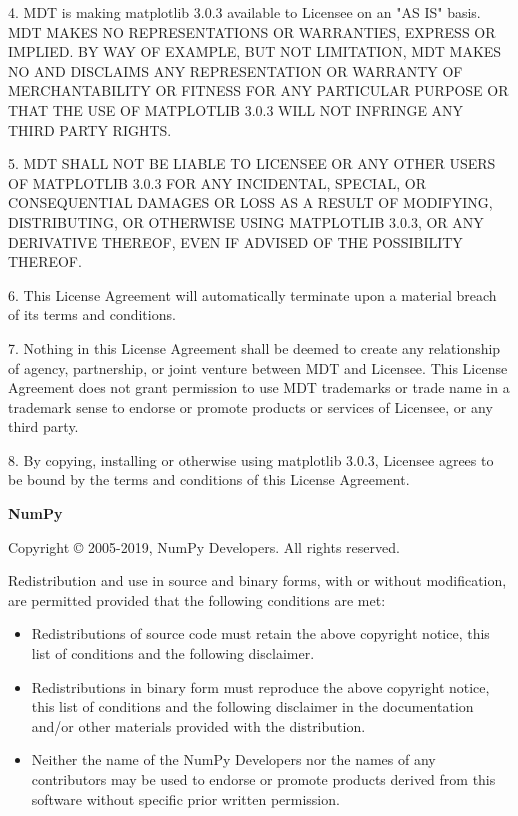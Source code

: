 4. MDT is making matplotlib 3.0.3 available to Licensee on an "AS IS" basis. MDT MAKES NO REPRESENTATIONS OR WARRANTIES, EXPRESS OR IMPLIED. BY WAY OF EXAMPLE, BUT NOT LIMITATION, MDT MAKES NO AND DISCLAIMS ANY REPRESENTATION OR WARRANTY OF MERCHANTABILITY OR FITNESS FOR ANY PARTICULAR PURPOSE OR THAT THE USE OF MATPLOTLIB 3.0.3 WILL NOT INFRINGE ANY THIRD PARTY RIGHTS.

5. MDT SHALL NOT BE LIABLE TO LICENSEE OR ANY OTHER USERS OF MATPLOTLIB 3.0.3 FOR ANY INCIDENTAL, SPECIAL, OR CONSEQUENTIAL DAMAGES OR LOSS AS A RESULT OF MODIFYING, DISTRIBUTING, OR OTHERWISE USING MATPLOTLIB 3.0.3, OR ANY DERIVATIVE THEREOF, EVEN IF ADVISED OF THE POSSIBILITY THEREOF.

6. This License Agreement will automatically terminate upon a material breach of its terms and conditions.

7. Nothing in this License Agreement shall be deemed to create any relationship of agency, partnership, or joint venture between MDT and Licensee. This License Agreement does not grant permission to use MDT trademarks or trade name in a trademark sense to endorse or promote products or services of Licensee, or any third party.

8. By copying, installing or otherwise using matplotlib 3.0.3, Licensee agrees to be bound by the terms and conditions of this License Agreement.
\newpage

\textbf{NumPy}

Copyright © 2005-2019, NumPy Developers.\newline
All rights reserved.

Redistribution and use in source and binary forms, with or without modification, are permitted provided that the following conditions are met:

\begin{itemize}
\item Redistributions of source code must retain the above copyright notice, this list of conditions and the following disclaimer.
\item Redistributions in binary form must reproduce the above copyright notice, this list of conditions and the following disclaimer in the documentation and/or other materials provided with the distribution.
\item Neither the name of the NumPy Developers nor the names of any contributors may be used to endorse or promote products derived from this software without specific prior written permission.	
\end{itemize}

